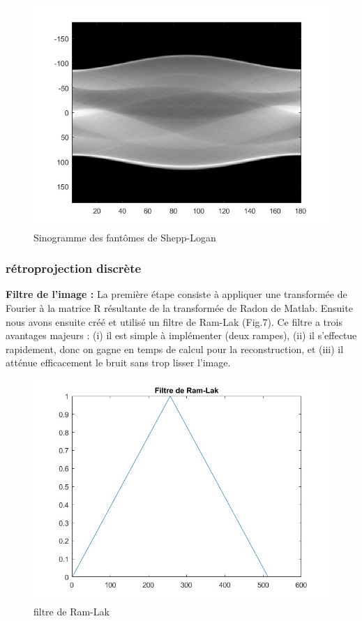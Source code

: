 \documentclass[conference]{IEEEtran}
\begin{document}
\begin{figure}[H]
\centering
\includegraphics[scale=0.5]{sinogramme}
\caption[Sinogramme des fantômes de Shepp-Logan]{Sinogramme des fantômes de Shepp-Logan}
\label{fig:gallery}
\end{figure}



\subsubsection{rétroprojection discrète }

\textbf{Filtre de l'image :} La première étape consiste à appliquer une transformée de Fourier à la matrice R résultante de la transformée de Radon de Matlab. Ensuite nous avons ensuite créé et utilisé un filtre de Ram-Lak (Fig.7). Ce filtre a trois avantages majeurs : (i) il est simple à implémenter (deux rampes), (ii) il s'effectue rapidement, donc on gagne en temps de calcul pour la reconstruction, et (iii) il atténue efficacement le bruit sans trop lisser l'image.

\begin{figure}[H]
\centering
\includegraphics[scale=0.4]{filtre-de-Ram-Lak}
\caption[filtre de Ram-Lak]{filtre de Ram-Lak}
\label{fig:gallery}
\end{figure}
\end{document}
